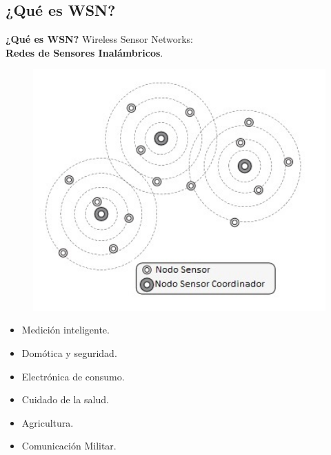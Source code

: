 \documentclass[aspectratio=43, handout]{beamer}
\begin{document}
\subsection[WSN]{¿Qué es WSN?}
\begin{frame}{\textbf{\LARGE{¿Qué es WSN?}}}
\fontsize{14pt}{14}\selectfont
\noindent Wireless Sensor Networks:\\
\textbf{Redes de Sensores Inalámbricos}.
\begin{minipage}[c]{1.0\linewidth}
	\begin{minipage}[c]{0.4\linewidth}
		\begin{figure}[H]			
		\includegraphics[width=1.2\textwidth]{./imagenes/WSN.jpg}
		\end{figure}	  	  	
	\end{minipage}
	\begin{minipage}[c]{0.57\linewidth}
					\vspace{10px}
		\begin{itemize}
			\vspace{5px}
			\item Medición inteligente.
			\vspace{5px}
			\item Domótica y seguridad.
			\vspace{5px}
			\item Electrónica de consumo.
			\vspace{5px}
			\item Cuidado de la salud.
			\vspace{5px}
			\item Agricultura.
			\vspace{5px}
			\item Comunicación Militar.
			\vspace{5px}
		\end{itemize}
\end{minipage}
\end{minipage}
\end{frame}
\end{document}
